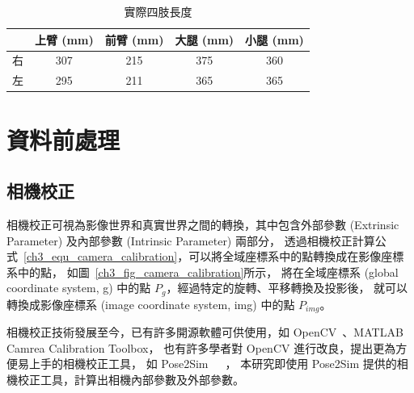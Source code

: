 \begin{table}[!ht]
   \caption[實際四肢長度]{實際四肢長度}
   \centering
   \label{ch3_limb_length}
   \setlength{\tabcolsep}{3pt}
   \renewcommand\arraystretch{1.5}
   \begin{tabular}{c|c|c|c|c}
       & 上臂 (mm) & 前臂 (mm) & 大腿 (mm) & 小腿 (mm) \\ 
      \midrule[2pt]
      右 & 307 & 215 & 375 & 360 \\
      左 & 295 & 211 & 365 & 365 \\
   \end{tabular}
\end{table}

\section{資料前處理}

\subsection{相機校正}
相機校正可視為影像世界和真實世界之間的轉換，其中包含外部參數 (Extrinsic Parameter) 及內部參數 (Intrinsic Parameter) 兩部分，
透過相機校正計算公式~\ref{ch3_equ_camera_calibration}，可以將全域座標系中的點轉換成在影像座標系中的點，
如圖~\ref{ch3_fig_camera_calibration}所示，
將在全域座標系 (global coordinate system, g) 中的點 $P_g$，經過特定的旋轉、平移轉換及投影後，
就可以轉換成影像座標系 (image coordinate system, img) 中的點 $P_{img}$。

相機校正技術發展至今，已有許多開源軟體可供使用，如 OpenCV~\cite{opencv_library}、MATLAB Camrea Calibration Toolbox，
也有許多學者對 OpenCV 進行改良，提出更為方便易上手的相機校正工具，
如 Pose2Sim~\cite{Pagnon_2022_JOSS}~\cite{Pagnon_2021_Robustness}~\cite{Pagnon_2022_Accuracy}，
本研究即使用 Pose2Sim 提供的相機校正工具，計算出相機內部參數及外部參數。

